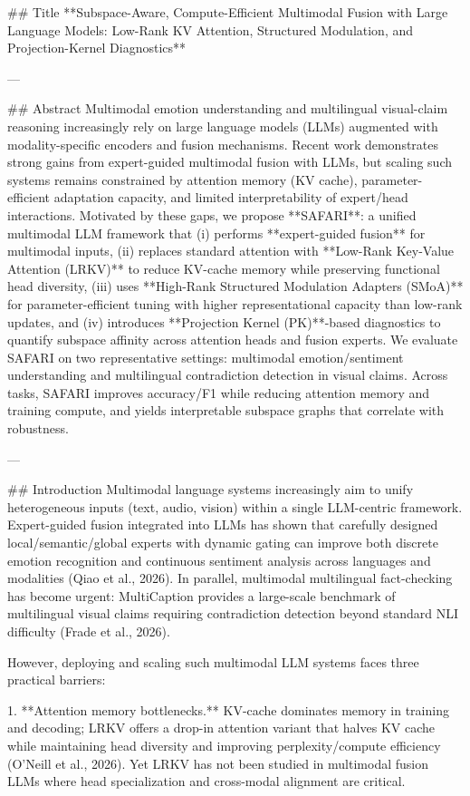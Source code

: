 ## Title  
**Subspace-Aware, Compute-Efficient Multimodal Fusion with Large Language Models: Low-Rank KV Attention, Structured Modulation, and Projection-Kernel Diagnostics**

---

## Abstract  
Multimodal emotion understanding and multilingual visual-claim reasoning increasingly rely on large language models (LLMs) augmented with modality-specific encoders and fusion mechanisms. Recent work demonstrates strong gains from expert-guided multimodal fusion with LLMs, but scaling such systems remains constrained by attention memory (KV cache), parameter-efficient adaptation capacity, and limited interpretability of expert/head interactions. Motivated by these gaps, we propose **SAFARI**: a unified multimodal LLM framework that (i) performs **expert-guided fusion** for multimodal inputs, (ii) replaces standard attention with **Low-Rank Key-Value Attention (LRKV)** to reduce KV-cache memory while preserving functional head diversity, (iii) uses **High-Rank Structured Modulation Adapters (SMoA)** for parameter-efficient tuning with higher representational capacity than low-rank updates, and (iv) introduces **Projection Kernel (PK)**-based diagnostics to quantify subspace affinity across attention heads and fusion experts. We evaluate SAFARI on two representative settings: multimodal emotion/sentiment understanding and multilingual contradiction detection in visual claims. Across tasks, SAFARI improves accuracy/F1 while reducing attention memory and training compute, and yields interpretable subspace graphs that correlate with robustness.  

---

## Introduction  
Multimodal language systems increasingly aim to unify heterogeneous inputs (text, audio, vision) within a single LLM-centric framework. Expert-guided fusion integrated into LLMs has shown that carefully designed local/semantic/global experts with dynamic gating can improve both discrete emotion recognition and continuous sentiment analysis across languages and modalities (Qiao et al., 2026). In parallel, multimodal multilingual fact-checking has become urgent: MultiCaption provides a large-scale benchmark of multilingual visual claims requiring contradiction detection beyond standard NLI difficulty (Frade et al., 2026).  

However, deploying and scaling such multimodal LLM systems faces three practical barriers:

1. **Attention memory bottlenecks.** KV-cache dominates memory in training and decoding; LRKV offers a drop-in attention variant that halves KV cache while maintaining head diversity and improving perplexity/compute efficiency (O’Neill et al., 2026). Yet LRKV has not been studied in multimodal fusion LLMs where head specialization and cross-modal alignment are critical.

